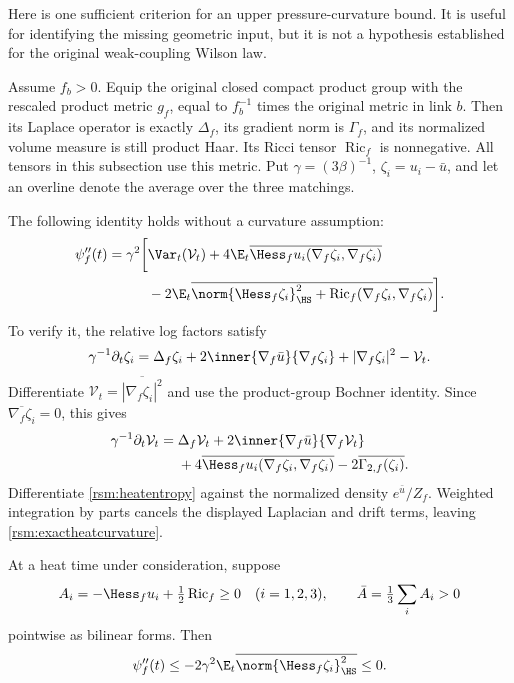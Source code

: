 Here is one sufficient criterion for an upper pressure-curvature bound. It is useful for identifying the missing geometric input, but it is not a hypothesis established for the original weak-coupling Wilson law.

Assume \(f_b>0\). Equip the original closed compact product group with the rescaled product metric \(g_f\), equal to \(f_b^{-1}\) times the original metric in link \(b\). Then its Laplace operator is exactly \(\Delta_f\), its gradient norm is \(\Gamma_f\), and its normalized volume measure is still product Haar. Its Ricci tensor \(\operatorname{Ric}_f\) is nonnegative. All tensors in this subsection use this metric. Put \(\gamma=(3\beta)^{-1}\), \(\zeta_i=u_i-\bar u\), and let an overline denote the average over the three matchings.

The following identity holds without a curvature assumption:
\begin{equation}
\begin{split}
 \psi_f''(t)=\gamma^2\bigg[
 &\Var_t(\mathcal V_t)
 +4\E_t\overline{
       \Hess_f u_i(\nabla_f\zeta_i,\nabla_f\zeta_i)}\\
 &-2\E_t\overline{
       \norm{\Hess_f\zeta_i}_{\HS}^2
       +\operatorname{Ric}_f(\nabla_f\zeta_i,\nabla_f\zeta_i)}
 \bigg].
\end{split}
 \label{rsm:exactheatcurvature}
\end{equation}
To verify it, the relative log factors satisfy
\[
 \gamma^{-1}\partial_t\zeta_i
 =\Delta_f\zeta_i
     +2\inner{\nabla_f\bar u}{\nabla_f\zeta_i}
     +|\nabla_f\zeta_i|^2-\mathcal V_t.
\]
Differentiate \(\mathcal V_t=\overline{|\nabla_f\zeta_i|^2}\) and use the product-group Bochner identity. Since \(\overline{\nabla_f\zeta_i}=0\), this gives
\[
\begin{split}
 \gamma^{-1}\partial_t\mathcal V_t
 ={}&\Delta_f\mathcal V_t
   +2\inner{\nabla_f\bar u}{\nabla_f\mathcal V_t}\\
 &+4\overline{\Hess_fu_i(\nabla_f\zeta_i,\nabla_f\zeta_i)}
   -2\overline{\Gamma_{2,f}(\zeta_i)}.
\end{split}
\]
Differentiate \eqref{rsm:heatentropy} against the normalized density \(e^{\bar u}/Z_f\). Weighted integration by parts cancels the displayed Laplacian and drift terms, leaving \eqref{rsm:exactheatcurvature}.

\begin{proposition}
\label{rsm:curvaturecriterion}
At a heat time under consideration, suppose
\[
 A_i=-\Hess_f u_i+\tfrac12\operatorname{Ric}_f\ge0
 \quad(i=1,2,3),\qquad
 \bar A=\tfrac13\sum_iA_i>0
\]
pointwise as bilinear forms. Then
\begin{equation}
 \psi_f''(t)\le
 -2\gamma^2\E_t\overline{\norm{\Hess_f\zeta_i}_{\HS}^2}
 \le0.
 \label{rsm:conditionalconcavity}
\end{equation}
\end{proposition}

